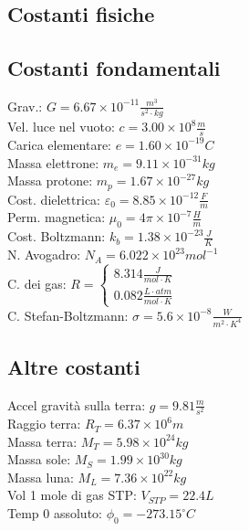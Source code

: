 \documentclass{article}
\begin{document}
\begin{small}
\begin{multicols}{3}
\section{Costanti fisiche}
	\subsection{Costanti fondamentali}
		Grav.: $ G = 6.67 \times 10^{-11} \frac{ m^3 }{ s^2 \cdot kg } $ \\
		Vel. luce nel vuoto: $ c = 3.00 \times 10^{8} \frac{ m }{ s } $ \\
		Carica elementare: $ e = 1.60 \times 10^{-19} C $ \\
		Massa elettrone: $ m_e = 9.11 \times 10^{-31} kg $ \\
		Massa protone: $ m_p = 1.67 \times 10^{-27} kg $ \\
		Cost. dielettrica: $ \varepsilon_0 = 8.85 \times 10^{-12} \frac{ F }{ m } $ \\
		Perm. magnetica: $ \mu_0 = 4 \pi \times 10^{-7} \frac{ H }{ m } $ \\
		Cost. Boltzmann: $ k_b = 1.38 \times 10^{-23} \frac{ J }{ K } $ \\
		N. Avogadro: $ N_A = 6.022 \times 10^{23} mol^{-1} $ \\
		C. dei gas: $ R = \begin{cases} 8.314 \frac{ J }{ mol \cdot K } \\ 0.082 \frac{ L \cdot atm }{ mol \cdot K } \end{cases} $ \\
		C. Stefan-Boltzmann: $ \sigma = 5.6 \times 10^{-8} \frac{ W }{ m^2 \cdot K^4 } $
	\subsection{Altre costanti}
		Accel gravità sulla terra: $ g = 9.81 \frac{ m }{ s^2 } $ \\
		Raggio terra: $ R_T = 6.37 \times 10^{6} m $ \\
		Massa terra: $ M_T = 5.98 \times 10^{24} kg $ \\
		Massa sole: $ M_S = 1.99 \times 10^{30} kg $ \\
		Massa luna: $ M_L = 7.36 \times 10^{22} kg $ \\
		Vol 1 mole di gas STP: $ V_{STP} = 22.4 L $ \\
		Temp 0 assoluto: $ \phi_0 = -273.15 ^{\circ} C $

\end{multicols}
\end{small}
\end{document}
